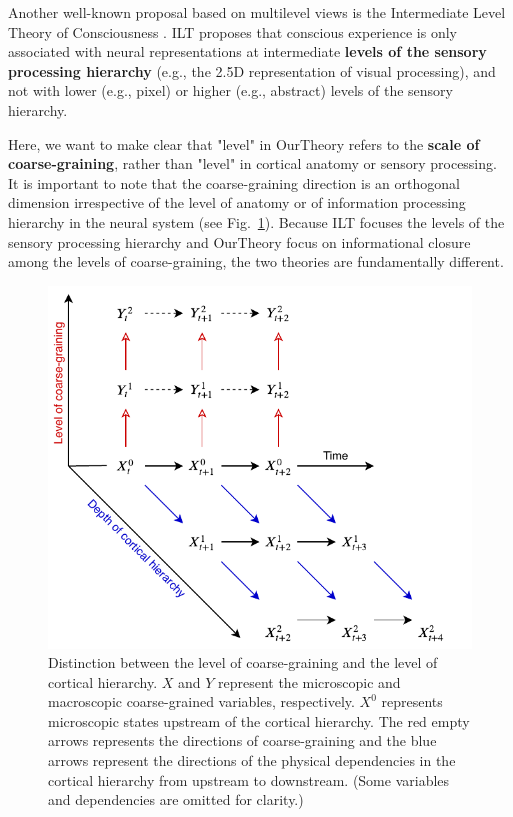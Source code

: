 \documentclass[utf8]{article}
\begin{document}
    		Another well-known proposal based on multilevel views is the Intermediate Level Theory of Consciousness \citep[ILT]{prinz2007intermediate, jackendoff1987consciousness}. ILT proposes that conscious experience is only associated with neural representations at intermediate \textbf{levels of the sensory processing hierarchy} (e.g., the 2.5D representation of visual processing), and not with lower (e.g., pixel) or higher (e.g., abstract) levels of the sensory hierarchy. 
    	
    		Here, we want to make clear that "level" in \ac{OurTheory} refers to the \textbf{scale of coarse-graining}, rather than "level" in cortical anatomy or sensory processing. It is important to note that the coarse-graining direction is an orthogonal dimension irrespective of the level of anatomy or of information processing hierarchy in the neural system (see Fig.~\ref{fig:hierarchy}). Because ILT focuses the levels of the sensory processing hierarchy and \ac{OurTheory} focus on informational closure among the levels of coarse-graining, the two theories are fundamentally different.  
    		
    		
    		\begin{figure}[H]
    			\includegraphics[width=\textwidth]{WritingMaterials/Fig_SeperationOfCGandCortHierachy/SeperationOfCGandCortHierachy.pdf}
				\caption{Distinction between the level of coarse-graining and the level of cortical hierarchy. $X$ and $Y$ represent the microscopic and macroscopic coarse-grained  variables, respectively. $X^0$ represents microscopic states upstream of the cortical hierarchy. The red empty arrows represents the directions of coarse-graining and the blue arrows represent the directions of the physical dependencies in the cortical hierarchy from upstream to downstream. (Some variables and dependencies are omitted for clarity.)}
				\label{fig:hierarchy}
    		\end{figure} 
    		
\end{document}
